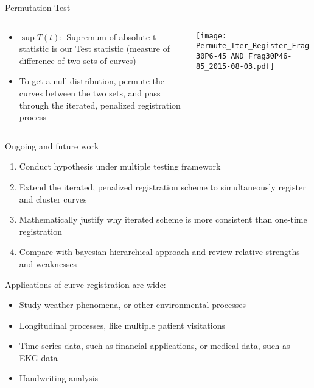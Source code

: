 \documentclass[final]{beamer}
\newlength{\onecolwid}
\begin{document}
\begin{frame}{}
\begin{columns}[t]
    \begin{column}{\onecolwid}\vspace{-1in}
      \begin{block}{Permutation Test}
      \begin{columns}
        \begin{column}{0.65\textwidth}
        \begin{itemize}
        \item $\sup{T}(t):$ Supremum of absolute t-statistic is our Test statistic (measure of difference of two sets of curves)
        \item To get a null distribution, permute the curves between the two sets, and pass through the iterated, penalized registration process
        \end{itemize}
        \end{column}
        \begin{column}{0.35\textwidth}
          \texttt{[image: Permute\_Iter\_Register\_Frag30P6-45\_AND\_Frag30P46-85\_2015-08-03.pdf]}
        \end{column}
      \end{columns}
      \end{block}
      \begin{block}{Ongoing and future work}
        \begin{enumerate}
        \item Conduct hypothesis under multiple testing framework
        \item Extend the iterated, penalized registration scheme to simultaneously register and cluster curves
        \item Mathematically justify why iterated scheme is more consistent than one-time registration
        \item Compare with bayesian hierarchical approach and review relative strengths and weaknesses
        \end{enumerate}
        Applications of curve registration are wide:
        \begin{itemize}
        \item Study weather phenomena, or other environmental processes
        \item Longitudinal processes, like multiple patient visitations
        \item Time series data, such as financial applications, or medical data, such as EKG data
        \item Handwriting analysis
        \end{itemize}
        

\end{block}
\end{column}
\end{columns}
\end{frame}
\end{document}

